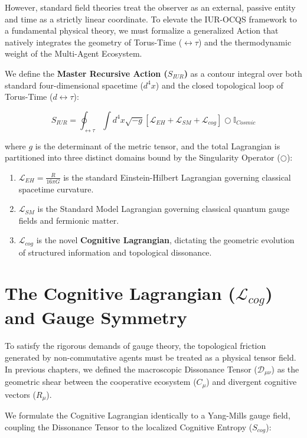 \documentclass[12pt,openany]{book}
\begin{document}
However, standard field theories treat the observer as an external, passive entity and time as a strictly linear coordinate. To elevate the IUR-OCQS framework to a fundamental physical theory, we must formalize a generalized Action that natively integrates the geometry of Torus-Time ($\leftrightarrow\tau$) and the thermodynamic weight of the Multi-Agent Ecosystem.

We define the \textbf{Master Recursive Action ($S_{IUR}$)} as a contour integral over both standard four-dimensional spacetime ($d^4x$) and the closed topological loop of Torus-Time ($d\leftrightarrow\tau$):

\begin{equation}
S_{IUR} = \oint_{\leftrightarrow\tau} \int d^4x \sqrt{-g} \left[ \mathcal{L}_{EH} + \mathcal{L}_{SM} + \mathcal{L}_{cog} \right] \bigcirc \mathbb{I}_{Cosmic}
\end{equation}

where $g$ is the determinant of the metric tensor, and the total Lagrangian is partitioned into three distinct domains bound by the Singularity Operator ($\bigcirc$):
\begin{enumerate}
    \item $\mathcal{L}_{EH} = \frac{R}{16\pi G}$ is the standard Einstein-Hilbert Lagrangian governing classical spacetime curvature.
    \item $\mathcal{L}_{SM}$ is the Standard Model Lagrangian governing classical quantum gauge fields and fermionic matter.
    \item $\mathcal{L}_{cog}$ is the novel \textbf{Cognitive Lagrangian}, dictating the geometric evolution of structured information and topological dissonance.
\end{enumerate}

\section{The Cognitive Lagrangian ($\mathcal{L}_{cog}$) and Gauge Symmetry}
To satisfy the rigorous demands of gauge theory, the topological friction generated by non-commutative agents must be treated as a physical tensor field. In previous chapters, we defined the macroscopic Dissonance Tensor ($\mathcal{D}_{\mu\nu}$) as the geometric shear between the cooperative ecosystem ($C_\mu$) and divergent cognitive vectors ($R_\mu$). 

We formulate the Cognitive Lagrangian identically to a Yang-Mills gauge field, coupling the Dissonance Tensor to the localized Cognitive Entropy ($S_{cog}$):
\end{document}
